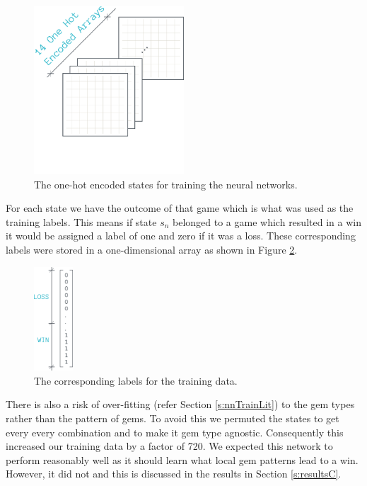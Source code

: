 \documentclass{bhamthesis}
\theoremstyle{definition}
\begin{document}
 \begin{figure}
 	\centering
 	\includegraphics[width=0.5\textwidth]{media/img/nnTraining}
 	\caption{The one-hot encoded states for training the neural networks.}\label{f:nnTraining}
 \end{figure}
 
For each state we have the outcome of that game which is what was used as the training labels. This means if state $s_n$ belonged to a game which resulted in a win it would be assigned a label of one and zero if it was a loss. These corresponding labels were stored in a one-dimensional array as shown in Figure \ref{f:nnLabels}.

 \begin{figure}
	\centering
	\includegraphics[width=0.13\textwidth]{media/img/nnLabels}
	\caption{The corresponding labels for the training data.}\label{f:nnLabels}
\end{figure}

There is also a risk of over-fitting (refer Section \ref{s:nnTrainLit}) to the gem types rather than the pattern of gems. To avoid this we permuted the states to get every every combination and to make it gem type agnostic. Consequently this increased our training data by a factor of 720.
We expected this network to perform reasonably well as it should learn what local gem patterns lead to a win. However, it did not and this is discussed in the results in Section \ref{s:resultsC}.
\end{document}
